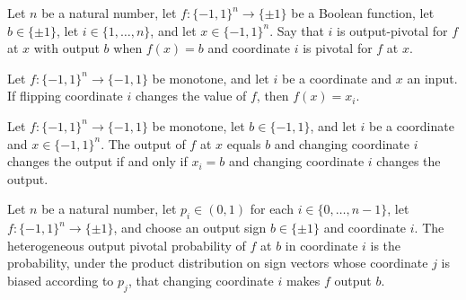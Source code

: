 \begin{definition}
\label{FABL.IsOutputPivotal}
\leanok
{}
Let $n$ be a natural number, let $f:\{-1,1\}^n\to\{\pm1\}$ be a Boolean function, let
$b\in\{\pm1\}$, let $i\in\{1,\ldots,n\}$, and let $x\in\{-1,1\}^n$. Say that $i$ is
output-pivotal for $f$ at $x$ with output $b$ when $f(x)=b$ and coordinate $i$ is
pivotal for $f$ at $x$.
\end{definition}

\begin{theorem}
\label{FABL.monotone_output_eq_coordinate_of_isPivotal}
\leanok
{}
Let $f:\{-1,1\}^n\to\{-1,1\}$ be monotone, and let $i$ be a coordinate and $x$ an input.
If flipping coordinate $i$ changes the value of $f$, then $f(x)=x_i$.
\end{theorem}

\begin{theorem}
\label{FABL.isOutputPivotal_iff_coordinate_eq_of_monotone}
\leanok
{}
Let $f\colon\{−1,1\}^n\to\{−1,1\}$ be monotone, let $b\in\{−1,1\}$, and let $i$ be a
coordinate and $x\in\{−1,1\}^n$. The output of $f$ at $x$ equals $b$ and changing
coordinate $i$ changes the output if and only if $x_i=b$ and changing coordinate $i$
changes the output.
\end{theorem}

\begin{definition}
\label{FABL.heterogeneousOutputPivotalProbability}
\leanok
{}
Let $n$ be a natural number, let $p_i\in(0,1)$ for each $i\in\{0,\ldots,n-1\}$, let
$f:\{-1,1\}^n\to\{\pm1\}$, and choose an output sign $b\in\{\pm1\}$ and coordinate $i$.
The heterogeneous output pivotal probability of $f$ at $b$ in coordinate $i$ is the
probability, under the product distribution on sign vectors whose coordinate $j$ is
biased according to $p_j$, that changing coordinate $i$ makes $f$ output $b$.
\end{definition}

